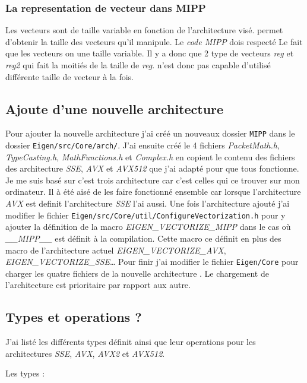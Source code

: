 \subsubsection{La representation de vecteur dans MIPP}
{
  Les vecteurs sont de taille variable en fonction de l'architecture visé. \MIPP permet
  d'obtenir la taille des vecteurs qu'il manipule. Le \emph{code MIPP} dois respecté
  Le fait que les vecteurs on une taille variable. Il y a donc que 2 type de vecteurs
  \emph{reg} et \emph{reg2} qui fait la moitiés de la taille de \emph{reg}.
  \MIPP n'est donc pas capable d'utilisé différente taille de vecteur à la fois.
}

\subsection{Ajoute d'une nouvelle architecture \MIPP}

Pour ajouter la nouvelle architecture \MIPP j'ai créé un nouveaux dossier \verb|MIPP|
dans le dossier \verb|Eigen/src/Core/arch/|. J'ai ensuite créé le 4 fichiers
\emph{PacketMath.h}, \emph{TypeCasting.h}, \emph{MathFunctions.h} et \emph{Complex.h}
en copient le contenu des fichiers des architecture \emph{SSE}, \emph{AVX} et \emph{AVX512}
que j'ai adapté pour que tous fonctionne. Je me suis basé sur c'est trois architecture
car c'est celles qui ce trouver sur mon ordinateur. Il à été aisé de les faire fonctionné
ensemble car lorsque l'architecture \emph{AVX} est definit l'architecture \emph{SSE} l'ai
aussi.
Une fois l'architecture ajouté j'ai modifier le fichier
\verb|Eigen/src/Core/util/ConfigureVectorization.h| pour y ajouter la définition de la
macro \emph{EIGEN_VECTORIZE_MIPP} dans le cas où \emph{__MIPP__} est définit à la
compilation. Cette macro ce définit en plus des macro de l'architecture actuel
\emph{EIGEN_VECTORIZE_AVX}, \emph{EIGEN_VECTORIZE_SSE}\dots
Pour finir j'ai modifier le fichier \verb|Eigen/Core| pour charger les quatre fichiers
de la nouvelle architecture \MIPP. Le chargement de l'architecture \MIPP est prioritaire
par rapport aux autre.

\subsection{Types et operations \Eigen ?}

J'ai listé les différents types \Eigen définit ainsi que leur operations pour les
architectures \emph{SSE}, \emph{AVX}, \emph{AVX2} et \emph{AVX512}.

Les types :

